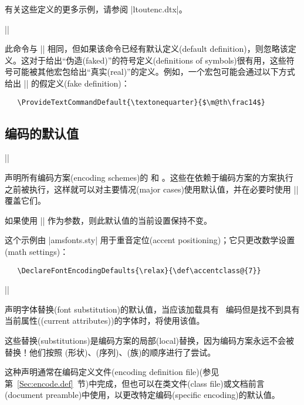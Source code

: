 \documentclass{ltxguide}[1995/11/28]
\newcommand{\heiti}{\CJKfamily{heiti}} %
\begin{document}
有关这些定义的更多示例，请参阅 |ltoutenc.dtx|。

\begin{decl}[1994/12/01]
  |\ProvideTextCommandDefault|  
\end{decl}
此命令与 |\DeclareTextCommandDefault| 相同，但如果该命令已经有默认定义(default definition)，则忽略该定义。这对于给出“伪造(faked)”的符号定义(definitions of symbols)很有用，这些符号可能被其他宏包给出“真实(real)”的定义。例如，一个宏包可能会通过以下方式给出 |\textonequarter| 的假定义(fake definition)：
\begin{verbatim}
   \ProvideTextCommandDefault{\textonequarter}{$\m@th\frac14$}
\end{verbatim}

\subsection[编码的默认值]{\heiti 编码的默认值} \label{sec:encoding-defaults}

\begin{decl}
  |\DeclareFontEncodingDefaults|  
\end{decl}

声明所有编码方案(encoding schemes)的  和 。这些在依赖于编码方案的方案执行之前被执行，这样就可以对主要情况(major cases)使用默认值，并在必要时使用 |\DeclareFontEncoding| 覆盖它们。

如果使用 |\relax| 作为参数，则此默认值的当前设置保持不变。

这个示例由 |amsfonts.sty| 用于重音定位(accent positioning)；它只更改数学设置(math settings)：
\begin{verbatim}
   \DeclareFontEncodingDefaults{\relax}{\def\accentclass@{7}}
\end{verbatim}


\begin{decl}
  |\DeclareFontSubstitution|    
\end{decl}

声明字体替换(font substitution)的默认值，当应该加载具有 \ 编码但是找不到具有当前属性((current attributes))的字体时，将使用该值。

这些替换(substitutions)是编码方案的局部(local)替换，因为编码方案永远不会被替换！他们按照 (形状)、(序列)、(族)的顺序进行了尝试。

这种声明通常在编码定义文件(encoding definition file)(参见第~\ref{Sec:encode.def}~节)中完成，但也可以在类文件(class file)或文档前言(document preamble)中使用，以更改特定编码(specific encoding)的默认值。
\end{document}

